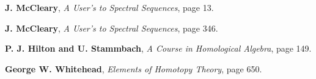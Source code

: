 \newpage
{\bf J. McCleary}, \emph{A User's to Spectral Sequences}, page 13.
\ifAAAA{}\else{}\fi

\newpage
{\bf J. McCleary}, \emph{A User's to Spectral Sequences}, page 346.

\newpage
{\bf P. J. Hilton and U. Stammbach}, \emph{A Course in Homological Algebra},
page 149.

\newpage
{\bf George W. Whitehead}, \emph{Elements of Homotopy Theory}, page 650.

\newpage

\newpage

\vfill
{}

